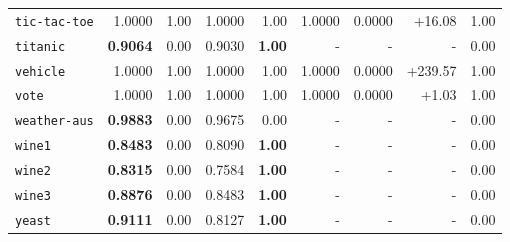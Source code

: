 \begin{tabular}{lrrrrrrrr}
\texttt{tic-tac-toe} & 1.0000 & 1.00 & 1.0000 & 1.00 & 1.0000 & 0.0000 & +16.08 & 1.00\\
\texttt{titanic} & \textbf{0.9064} & 0.00 & 0.9030 & \textbf{1.00} & - & - & - & 0.00\\
\texttt{vehicle} & 1.0000 & 1.00 & 1.0000 & 1.00 & 1.0000 & 0.0000 & +239.57 & 1.00\\
\texttt{vote} & 1.0000 & 1.00 & 1.0000 & 1.00 & 1.0000 & 0.0000 & +1.03 & 1.00\\
\texttt{weather-aus} & \textbf{0.9883} & 0.00 & 0.9675 & 0.00 & - & - & - & 0.00\\
\texttt{wine1} & \textbf{0.8483} & 0.00 & 0.8090 & \textbf{1.00} & - & - & - & 0.00\\
\texttt{wine2} & \textbf{0.8315} & 0.00 & 0.7584 & \textbf{1.00} & - & - & - & 0.00\\
\texttt{wine3} & \textbf{0.8876} & 0.00 & 0.8483 & \textbf{1.00} & - & - & - & 0.00\\
\texttt{yeast} & \textbf{0.9111} & 0.00 & 0.8127 & \textbf{1.00} & - & - & - & 0.00\\
\bottomrule
\end{tabular}
